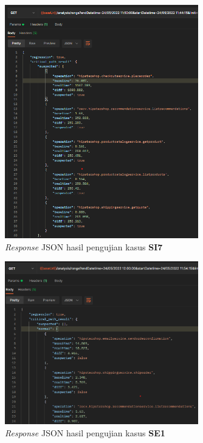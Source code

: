 
\begin{figure}[!htb]
	\centering
	\includegraphics[width=0.75\textwidth]{resources/ch4/json/7.png}
	\caption{\textit{Response} JSON hasil pengujian kasus \textbf{SI7}}
	\label{result_json_7}
\end{figure}
%

\begin{figure}[!htb]
	\centering
	\includegraphics[width=0.75\textwidth]{resources/ch4/json/8.png}
	\caption{\textit{Response} JSON hasil pengujian kasus \textbf{SE1}}
	\label{result_json_8}
\end{figure}

